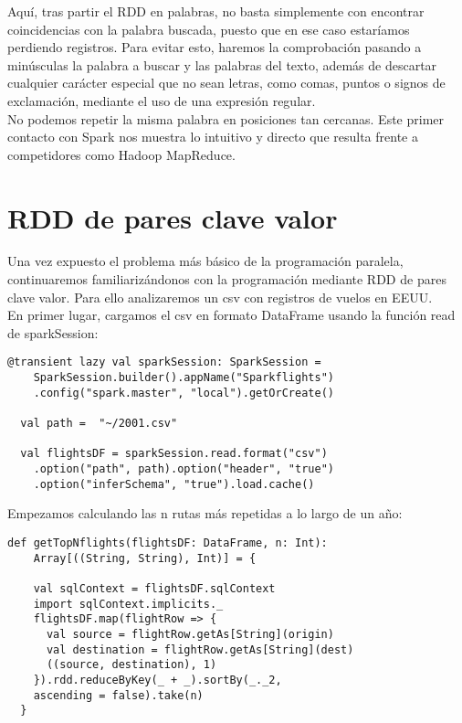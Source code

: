 Aquí, tras partir el RDD en palabras, no basta simplemente con encontrar coincidencias con la palabra buscada, puesto que en ese caso estaríamos perdiendo registros. Para evitar esto, haremos la comprobación pasando a minúsculas la palabra a buscar y las palabras del texto, además de descartar cualquier carácter especial que no sean letras, como comas, puntos o signos de exclamación, mediante el uso de una expresión regular.\\
     
No podemos repetir la misma palabra en posiciones tan cercanas. Este primer contacto con Spark nos muestra lo intuitivo y directo que resulta frente a competidores como Hadoop MapReduce.\\

\section{RDD de pares clave valor}

Una vez expuesto el problema más básico de la programación paralela, continuaremos familiarizándonos con la programación mediante RDD de pares clave valor. Para ello analizaremos un csv con registros de vuelos en EEUU.\\ 

En primer lugar, cargamos el csv en formato DataFrame usando la función read de sparkSession: \\

\begin{lstlisting}[frame=single]
  @transient lazy val sparkSession: SparkSession =
    SparkSession.builder().appName("Sparkflights")
    .config("spark.master", "local").getOrCreate()
    
  val path =  "~/2001.csv"
  
  val flightsDF = sparkSession.read.format("csv")
  	.option("path", path).option("header", "true")
  	.option("inferSchema", "true").load.cache()
\end{lstlisting}

Empezamos calculando las n rutas más repetidas a lo largo de un año:\\

\begin{lstlisting}[frame=single]
  def getTopNflights(flightsDF: DataFrame, n: Int): 
  	Array[((String, String), Int)] = {
  	
    val sqlContext = flightsDF.sqlContext
    import sqlContext.implicits._
    flightsDF.map(flightRow => {
      val source = flightRow.getAs[String](origin)
      val destination = flightRow.getAs[String](dest)
      ((source, destination), 1)
    }).rdd.reduceByKey(_ + _).sortBy(_._2, 
    ascending = false).take(n)
  }
\end{lstlisting}

